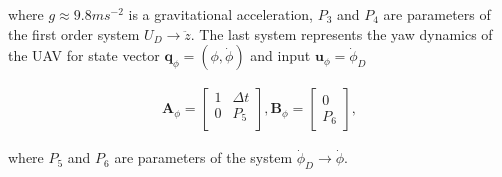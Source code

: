 where $g \approx 9.8 ms^{-2}$ is a gravitational acceleration, $P_3$ and $P_4$ are parameters of the first order system $U_D \rightarrow \ddot{z}$. The last system represents the yaw dynamics of the UAV for state vector $\mathbf{q}_{\phi} = \left(\phi, \dot{\phi}\right)$ and input $\mathbf{u}_\phi = \dot{\phi}_D$

\begin{equation}
\begin{split}
\mathbf{A}_{\phi} = \begin{bmatrix}
1 & \Delta t\\
0 & P_5 \\
\end{bmatrix}, \mathbf{B}_{\phi} = \begin{bmatrix}
0\\
P_6
\end{bmatrix},
\end{split}
\end{equation}

where $P_5$ and $P_6$ are parameters of the system $\dot{\phi}_D \rightarrow \dot{\phi}$.